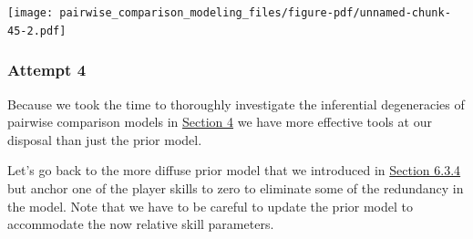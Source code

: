 \documentclass[
  letterpaper,
  DIV=11,
  numbers=noendperiod]{scrartcl}
\begin{document}
\texttt{[image: pairwise\_comparison\_modeling\_files/figure-pdf/unnamed-chunk-45-2.pdf]}

\subsubsection{Attempt 4}\label{attempt-4}

Because we took the time to thoroughly investigate the inferential
degeneracies of pairwise comparison models in
\hyperref[sec:inf-degen]{Section 4} we have more effective tools at our
disposal than just the prior model.

Let's go back to the more diffuse prior model that we introduced in
\hyperref[sec:demo-binary-comp-2]{Section 6.3.4} but anchor one of the
player skills to zero to eliminate some of the redundancy in the model.
Note that we have to be careful to update the prior model to accommodate
the now relative skill parameters.
\end{document}
